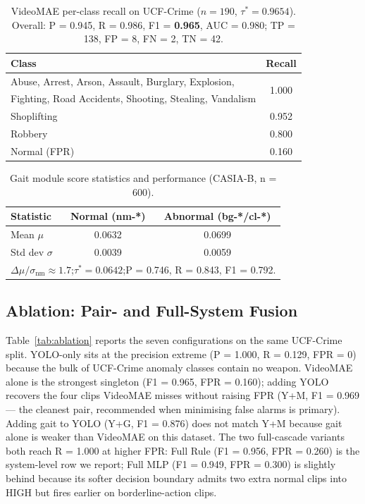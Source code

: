 \documentclass[runningheads]{llncs}
\begin{document}
\begin{table}[!htbp]
\caption{VideoMAE per-class recall on UCF-Crime ($n = 190$, $\tau^* = 0.9654$). Overall: P = 0.945, R = 0.986, F1 = \textbf{0.965}, AUC = 0.980; TP = 138, FP = 8, FN = 2, TN = 42.}
\label{tab:mae}
\centering
\small
\begin{tabular}{lc}
\toprule
\textbf{Class} & \textbf{Recall}\\
\midrule
Abuse, Arrest, Arson, Assault, Burglary, Explosion, & \multirow{2}{*}{1.000}\\
Fighting, Road Accidents, Shooting, Stealing, Vandalism & \\
Shoplifting & 0.952\\
Robbery & 0.800\\
Normal (FPR) & 0.160\\
\bottomrule
\end{tabular}
\end{table}

\begin{table}[!htbp]
\caption{Gait module score statistics and performance (CASIA-B, n = 600).}
\label{tab:gait}
\centering
\begin{tabular}{lcc}
\toprule
\textbf{Statistic} & \textbf{Normal (nm-*)} & \textbf{Abnormal (bg-*/cl-*)}\\
\midrule
Mean $\mu$       & 0.0632 & 0.0699\\
Std dev $\sigma$ & 0.0039 & 0.0059\\
\midrule
\multicolumn{3}{l}{$\Delta\mu / \sigma_\text{nm} \approx 1.7$;\quad $\tau^* = 0.0642$;\quad P = 0.746, R = 0.843, F1 = 0.792.}\\
\bottomrule
\end{tabular}
\end{table}

\subsection{Ablation: Pair- and Full-System Fusion}\label{sec:pair-fusion}\label{sec:full-system}

Table~\ref{tab:ablation} reports the seven configurations on the same UCF-Crime split. YOLO-only sits at the precision extreme (P = 1.000, R = 0.129, FPR = 0) because the bulk of UCF-Crime anomaly classes contain no weapon. VideoMAE alone is the strongest singleton (F1 = 0.965, FPR = 0.160); adding YOLO recovers the four clips VideoMAE misses without raising FPR (Y+M, F1 = 0.969 --- the cleanest pair, recommended when minimising false alarms is primary). Adding gait to YOLO (Y+G, F1 = 0.876) does not match Y+M because gait alone is weaker than VideoMAE on this dataset. The two full-cascade variants both reach R = 1.000 at higher FPR: Full Rule (F1 = 0.956, FPR = 0.260) is the system-level row we report; Full MLP (F1 = 0.949, FPR = 0.300) is slightly behind because its softer decision boundary admits two extra normal clips into HIGH but fires earlier on borderline-action clips.
\end{document}
